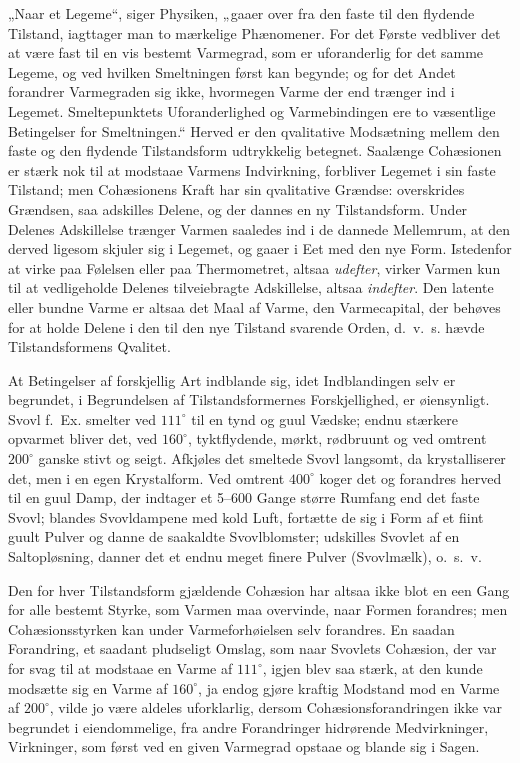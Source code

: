 \documentclass[12pt]{book}
\newcommand{\opage}[1]{\marginnote{\footnotesize\textit{[#1]}}}
\begin{document}
„Naar et Legeme“, siger Physiken, „gaaer over fra den faste til den flydende
Tilstand, iagttager man to mærkelige Phænomener. For det Første vedbliver det at være
fast til en vis bestemt Varmegrad, som er uforanderlig for det samme Legeme, og ved
hvilken Smeltningen først kan begynde; og for det Andet forandrer Varmegraden sig
ikke, hvormegen Varme der end trænger ind i Legemet. Smeltepunktets Uforanderlighed
og Varmebindingen ere to væsentlige Betingelser for Smeltningen.“ Herved er den
qvalitative Modsætning mellem den faste og den flydende Tilstandsform udtrykkelig
betegnet. Saalænge Cohæsionen er stærk nok til at modstaae Varmens Indvirkning,
forbliver Legemet i sin faste Tilstand; men Cohæsionens Kraft har sin qvalitative
Grændse: overskrides Grændsen, saa adskilles Delene, og der dannes en ny
Tilstandsform. Under Delenes Adskillelse trænger Varmen saaledes ind i de dannede
Mellemrum, at den derved ligesom skjuler sig i Legemet, og gaaer i Eet med den nye
Form. Istedenfor at virke paa Følelsen eller paa Thermometret, altsaa \emph{udefter},
virker Varmen kun til at vedligeholde Delenes tilveiebragte Adskillelse, altsaa
\emph{indefter}. Den latente eller bundne Varme er altsaa det Maal af
\opage{322} Varme, den Varmecapital, der behøves for at holde Delene i den til den nye Tilstand
svarende Orden, d.\ v.\ s. hævde Tilstandsformens Qvalitet.

At Betingelser af forskjellig Art indblande sig, idet Indblandingen selv er
begrundet, i Begrundelsen af Tilstandsformernes Forskjellighed, er øiensynligt. Svovl
f.\ Ex. smelter ved $111^{\circ}$ til en tynd og guul Vædske; endnu stærkere opvarmet
bliver det, ved $160^{\circ}$, tyktflydende, mørkt, rødbruunt og ved omtrent
$200^{\circ}$ ganske stivt og seigt. Afkjøles det smeltede Svovl langsomt, da
krystalliserer det, men i en egen Krystalform. Ved omtrent $400^{\circ}$ koger det og
forandres herved til en guul Damp, der indtager et 5--600 Gange større Rumfang end
det faste Svovl; blandes Svovldampene med kold Luft, fortætte de sig i Form af et
fiint guult Pulver og danne de saakaldte Svovlblomster; udskilles Svovlet af en
Saltopløsning, danner det et endnu meget finere Pulver (Svovlmælk), o.\ s.\ v.

Den for hver Tilstandsform gjældende Cohæsion har altsaa ikke blot en een Gang for
alle bestemt Styrke, som Varmen maa overvinde, naar Formen forandres; men
Cohæsionsstyrken kan under Varmeforhøielsen selv forandres. En saadan Forandring, et
saadant pludseligt Omslag, som naar Svovlets Cohæsion, der var for svag til at
modstaae en Varme af $111^{\circ}$, igjen blev saa stærk, at den kunde modsætte sig en
Varme af $160^{\circ}$, ja endog gjøre kraftig Modstand mod en Varme af $200^{\circ}$,
vilde jo være aldeles uforklarlig, dersom Cohæsionsforandringen ikke var begrundet i
eiendommelige, fra andre Forandringer hidrørende Medvirkninger, Virkninger, som først
ved en given Varmegrad opstaae og blande sig i Sagen.
\end{document}
